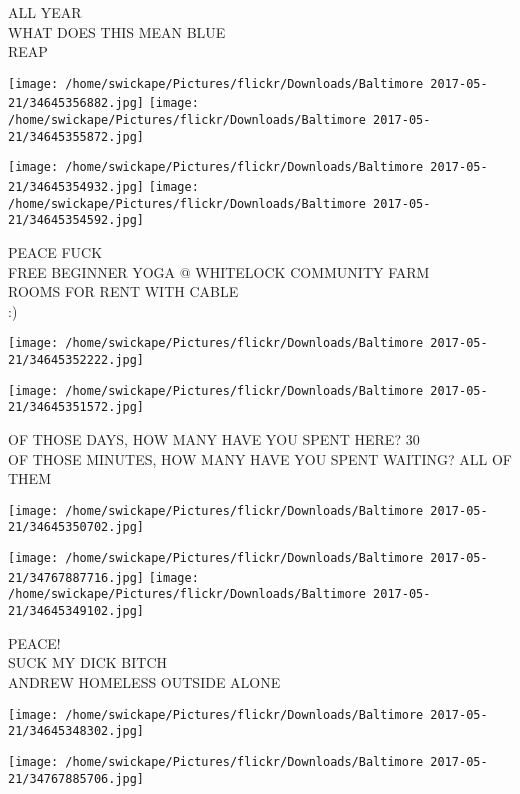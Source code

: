 \documentclass[10pt,letterpaper]{article}
\begin{document}
ALL YEAR\\
WHAT DOES THIS MEAN BLUE\\
REAP\\
\pagebreak

\texttt{[image: /home/swickape/Pictures/flickr/Downloads/Baltimore 2017-05-21/34645356882.jpg]}
\texttt{[image: /home/swickape/Pictures/flickr/Downloads/Baltimore 2017-05-21/34645355872.jpg]}

\texttt{[image: /home/swickape/Pictures/flickr/Downloads/Baltimore 2017-05-21/34645354932.jpg]}
\texttt{[image: /home/swickape/Pictures/flickr/Downloads/Baltimore 2017-05-21/34645354592.jpg]}

PEACE FUCK\\
FREE BEGINNER YOGA @ WHITELOCK COMMUNITY FARM\\
ROOMS FOR RENT WITH CABLE\\
:)\\
\pagebreak

\texttt{[image: /home/swickape/Pictures/flickr/Downloads/Baltimore 2017-05-21/34645352222.jpg]}

\vspace{0.25in}
\texttt{[image: /home/swickape/Pictures/flickr/Downloads/Baltimore 2017-05-21/34645351572.jpg]}

OF THOSE DAYS, HOW MANY HAVE YOU SPENT HERE?  30\\
OF THOSE MINUTES, HOW MANY HAVE YOU SPENT WAITING?  ALL OF THEM\\
\pagebreak

\texttt{[image: /home/swickape/Pictures/flickr/Downloads/Baltimore 2017-05-21/34645350702.jpg]}

\vspace{0.25in}
\texttt{[image: /home/swickape/Pictures/flickr/Downloads/Baltimore 2017-05-21/34767887716.jpg]}
\texttt{[image: /home/swickape/Pictures/flickr/Downloads/Baltimore 2017-05-21/34645349102.jpg]}

PEACE!\\
SUCK MY DICK BITCH\\
ANDREW HOMELESS OUTSIDE ALONE\\
\pagebreak

\texttt{[image: /home/swickape/Pictures/flickr/Downloads/Baltimore 2017-05-21/34645348302.jpg]}

\vspace{0.25in}
\texttt{[image: /home/swickape/Pictures/flickr/Downloads/Baltimore 2017-05-21/34767885706.jpg]}
\end{document}
